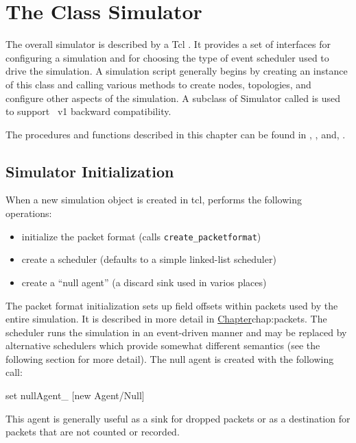 %
%
\chapter{The Class Simulator}
\label{chap:sim}

The overall simulator is described by a Tcl
.
It provides a set of interfaces for configuring a simulation
and for choosing the type of event scheduler used to drive
the simulation.
A simulation script generally begins by creating an instance
of this class and calling various methods to create nodes, topologies,
and configure other aspects of the simulation.
A subclass of Simulator called  is used to support
\ns~v1 backward compatibility.

The procedures and functions described in this chapter can be found in
, , and, .

\section{Simulator Initialization}
\label{sec:siminit}

When a new simulation object is created in tcl,
performs the following operations:
\begin{itemize}
        \item initialize the packet format (calls {\tt create\_packetformat})
        \item create a scheduler (defaults to a simple linked-list scheduler)
        \item create a ``null agent'' (a discard sink used in varios places)
\end{itemize}
The packet format initialization sets up field offsets within packets
used by the entire simulation.  It is described in more detail
in \href{the following chapter on packets}{Chapter}{chap:packets}.
The scheduler runs the simulation in an event-driven manner and may
be replaced by alternative schedulers which provide somewhat
different semantics (see the following section for more detail).
The null agent is created with the following call:
\begin{program}
        set nullAgent_ [new Agent/Null]
\end{program}
This agent is generally useful as a sink for dropped packets or
as a destination for packets that are not counted or recorded.

